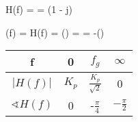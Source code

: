 \begin{abox}
	H(f) =  =  \cdot \left(1 - j\right)
\end{abox}

\begin{abox}
	\phi(f) = \sphericalangle H(f) = \arctan() = \arctan {} = -\arctan()
\end{abox}

\begin{abox}
	\begin{tabular}{c | c c c}
		f & 0 & $f_g$ & $\infty$\\\hline
		$\left|H(f)\right|$ & $K_p$ & $\frac{K_p}{\sqrt{2}}$ & 0\\
		$\sphericalangle H(f)$ & 0 & -$\frac{\pi}{4}$ & $-\frac{\pi}{2}$
	\end{tabular}
\end{abox}

















